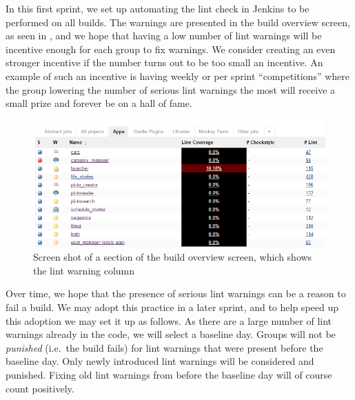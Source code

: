 In this first sprint, we set up automating the lint check in Jenkins to be performed on all builds. The warnings are presented in the build overview screen, as seen in , and we hope that having a low number of lint warnings will be incentive enough for each group to fix warnings. We consider creating an even stronger incentive if the number turns out to be too small an incentive. An example of such an incentive is having weekly or per sprint ``competitions'' where the group lowering the number of serious lint warnings the most will receive a small prize and forever be on a hall of fame.

\begin{figure}[htbp]
    \includegraphics[width=\textwidth]{graphics/jenkins-overview-part}
    \caption{Screen shot of a section of the build overview screen, which shows the lint warning column}
    \label{fig:jenkins-overview}
\end{figure}

Over time, we hope that the presence of serious lint warnings can be a reason to fail a build. We may adopt this practice in a later sprint, and to help speed up this adoption we may set it up as follows. As there are a large number of lint warnings already in the code, we will select a baseline day. Groups will not be \emph{punished} (i.e.\ the build fails) for lint warnings that were present before the baseline day. Only newly introduced lint warnings will be considered and punished. Fixing old lint warnings from before the baseline day will of course count positively.

